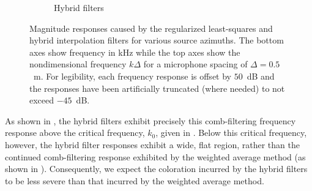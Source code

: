 \begin{figure}[t]
\begin{subfigure}[b]{0.49\textwidth}
        		\caption{Hybrid filters}
        		\label{fig:08_Proposed_Method:Azimuth_Dependence:Hybrid}
    	\end{subfigure}
	
	\caption[Magnitude responses across azimuths for each interpolation filter.]{
	Magnitude responses caused by the regularized least-squares and hybrid interpolation filters for various source azimuths.
  The bottom axes show frequency in kHz while the top axes show the nondimensional frequency $k\Delta$ for a microphone spacing of $\Delta = 0.5$~m.
  For legibility, each frequency response is offset by $50$~dB and the responses have been artificially truncated (where needed) to not exceed $-45$~dB.}
	\label{fig:08_Proposed_Method:Azimuth_Dependence}
\end{figure} %

As shown in , the hybrid filters exhibit precisely this comb-filtering frequency response above the critical frequency, $k_0$, given in .
Below this critical frequency, however, the hybrid filter responses exhibit a wide, flat region, rather than the continued comb-filtering response exhibited by the weighted average method (as shown in ).
Consequently, we expect the coloration incurred by the hybrid filters to be less severe than that incurred by the weighted average method.